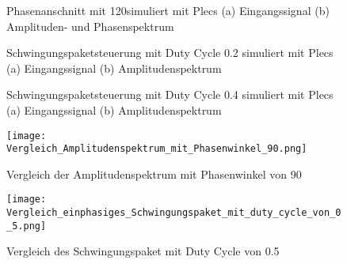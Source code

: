 \begin{appendix}
\begin{figure}[ht!]
	\centering
	\qquad
	\caption{Phasenanschnitt mit 120\textdegree simuliert mit Plecs (a) Eingangssignal (b) Amplituden- und Phasenspektrum}
	\label{fig:Plecs_mit_phasenanschnitt_120}
\end{figure}


\begin{figure}[ht!]
	\centering
	\qquad
	\caption{Schwingungspaketsteuerung mit Duty Cycle 0.2 simuliert mit Plecs (a) Eingangssignal (b) Amplitudenspektrum}
	\label{fig:Schwingungspaketsteuerung_mit_duty_cycle_0_2 simuliert_mit_Plecs}
\end{figure}

\newpage

\begin{figure}[ht!]
	\centering
	\qquad
	\caption{Schwingungspaketsteuerung mit Duty Cycle 0.4 simuliert mit Plecs (a) Eingangssignal (b) Amplitudenspektrum}
	\label{fig:Schwingungspaketsteuerung_mit_duty_cycle_0_4 simuliert_mit_Plecs}
\end{figure}


\begin{figure}[ht!]
	\centering
	\texttt{[image: Vergleich\_Amplitudenspektrum\_mit\_Phasenwinkel\_90.png]}	
	\caption{Vergleich der Amplitudenspektrum mit Phasenwinkel von 90\textdegree}
	\label{fig:Vergleich_der_Amplitudenspektrum_mit Phasenwinkel_von_90}
\end{figure}

\begin{figure}[ht!]
	\centering
	\texttt{[image: Vergleich\_einphasiges\_Schwingungspaket\_mit\_duty\_cycle\_von\_0\_5.png]}	
	\caption{Vergleich des Schwingungspaket mit Duty Cycle von 0.5}
	\label{fig:Vergleich des Schwingungspaket mit Duty Cycle von 0.5}
\end{figure}


\end{appendix}
